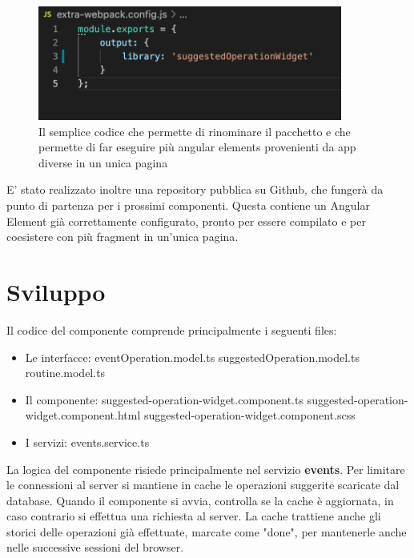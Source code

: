 \begin{figure}[H]
    \centering
    \includegraphics[width=100mm]{img/webpack-extra.png}
    \caption{Il semplice codice che permette di rinominare il pacchetto e che permette di 
    far eseguire più angular elements provenienti da app diverse in un unica pagina}
  \end{figure}
E' stato realizzato inoltre una repository pubblica su Github, che fungerà da punto di partenza per i prossimi componenti. 
Questa contiene un Angular Element già correttamente configurato, pronto per essere compilato e 
per coesistere con più fragment in un'unica pagina.\cite{repogit}

\section{Sviluppo}
Il codice del componente comprende principalmente i seguenti files:
\begin{itemize}
    \item Le interfacce:
    \subitem eventOperation.model.ts
    \subitem suggestedOperation.model.ts
    \subitem routine.model.ts
\end{itemize}

\begin{itemize}
    \item Il componente:
    \subitem suggested-operation-widget.component.ts
    \subitem suggested-operation-widget.component.html
    \subitem suggested-operation-widget.component.scss
\end{itemize}

\begin{itemize}
    \item I servizi:
    \subitem events.service.ts
 \end{itemize}
 La logica del componente risiede principalmente nel servizio \textbf{events}.
 Per limitare le connessioni al server si mantiene in cache le operazioni suggerite scaricate dal database.
 Quando il componente si avvia, controlla se la cache è aggiornata, in caso contrario si effettua una richiesta
 al server.
 La cache trattiene anche gli storici delle operazioni già effettuate, marcate come "done", 
 per mantenerle anche nelle successive sessioni del browser.

